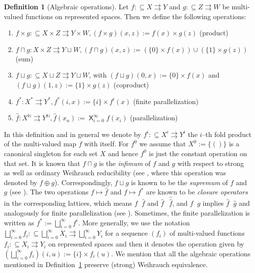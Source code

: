 \documentclass[a4paper]{amsart}
\def\IN{{\mathbb{N}}}
\def\In{\subseteq}
\def\mto{\rightrightarrows}
\def\leqW{\mathop{\leq_{\mathrm{W}}}}
\def\equivW{\mathop{\equiv_{\mathrm{W}}}}
\def\bigtimes{\mathop{\mathsf{X}}}
\theoremstyle{definition}
\newtheorem{definition}[theorem]{Definition}
\begin{document}
\begin{definition}[Algebraic operations]
\label{def:algebraic-operations}
Let $f:\In X\mto Y$ and $g:\In Z\mto W$ be multi-valued functions on represented spaces. Then we define
the following operations:
\begin{enumerate}
\itemsep 0.2cm
\item $f\times g:\In X\times Z\mto Y\times W, (f\times g)(x,z):=f(x)\times g(z)$ \hfill (product)
\item $f\sqcap g:X\times Z\mto Y\sqcup W, (f\sqcap g)(x,z):=(\{0\}\times f(x))\cup(\{1\}\times g(z))$ \hfill (sum)
\item $f\sqcup g:\In X\sqcup Z\mto Y\sqcup W$, with $(f\sqcup g)(0,x):=\{0\}\times f(x)$ and\\
        $(f\sqcup g)(1,z):=\{1\}\times g(z)$ \hfill (coproduct)
\item $f^*:X^*\mto Y^*,f^*(i,x):=\{i\}\times f^i(x)$ \hfill (finite parallelization)
\item $\widehat{f}:X^\IN\mto Y^\IN,\widehat{f}(x_n):=\bigtimes_{i=0}^\infty f(x_i)$ \hfill (parallelization)
\end{enumerate}
\end{definition}

In this definition and in general we denote by $f^i:\In X^i\mto Y^i$ the $i$--th fold product
of the multi-valued map $f$ with itself. For $f^0$ we assume that $X^0:=\{()\}$ is a canonical
singleton for each set $X$ and hence $f^0$ is just the constant operation on that set.
It is known that $f\sqcap g$ is the {\em infimum} of $f$ and $g$ with respect to strong as well as
ordinary Weihrauch reducibility (see \cite{BG11}, where this operation was denoted by $f\oplus g$).
Correspondingly, $f\sqcup g$ is known to be the {\em supremum} of $f$ and $g$ (see \cite{Pau09}).
The two operations $f\mapsto\widehat{f}$ and $f\mapsto f^*$ are known to be {\em closure operators}
in the corresponding lattices, which means
$f \leqW \widehat{f}$ and $\widehat{f} \equivW\,\widehat{\!\!\widehat{f}}$, and $f \leqW g$ implies $\widehat{f} \leqW \widehat{g}$
and analogously for finite parallelization (see \cite{BG11,Pau09}).
Sometimes, the finite parallelization is written as $f^*:=\bigsqcup_{i=0}^\infty f^i$. 
More generally, we use the notation $\bigsqcup_{i=0}^\infty f_i:\In\bigsqcup_{i=0}^\infty X_i\mto\bigsqcup_{i=0}^\infty Y_i$ 
for a sequence $(f_i)$ of multi-valued functions $f_i:\In X_i\mto Y_i$ on represented spaces and then it denotes
the operation given by $(\bigsqcup_{i=0}^\infty f_i)(i,u):=\{i\}\times f_i(u)$. 
We mention that all the algebraic operations mentioned in Definition~\ref{def:algebraic-operations} preserve
(strong) Weihrauch equivalence. 
\end{document}
